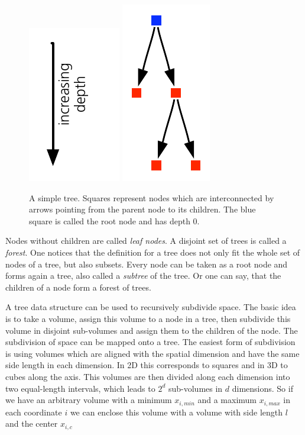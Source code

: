 \begin{figure}[htbp]
\begin{center}
\includegraphics[scale=1.0]{10tree_depth.pdf}
\includegraphics{08simpletree.pdf}
\caption{A simple tree. Squares represent nodes which are interconnected by arrows pointing from the parent node to its children. The blue square is called the root node and has depth $0$.}
\label{ch02_fig10}
\end{center}
\end{figure}

Nodes without children are called \emph{leaf nodes}. A disjoint set of trees is called a \emph{forest}. One notices that the definition for a tree does not only fit the whole set of nodes of a tree, but also subsets. Every node can be taken as a root node and forms again a tree, also called a \emph{subtree} of the tree. Or one can say, that the children of a node form a forest of trees.

A tree data structure can be used to recursively subdivide space. The basic idea is to take a volume, assign this volume to a node in a tree, then subdivide this volume in disjoint sub-volumes and assign them to the children of the node. The subdivision of space can be mapped onto a tree. The easiest form of subdivision is using volumes which are aligned with the spatial dimension and have the same side length in each dimension. In 2D this corresponds to squares and in 3D to cubes along the axis. This volumes are then divided along each dimension into two equal-length intervals, which leads to $2^d$ sub-volumes in $d$ dimensions. So if we have an arbitrary volume with a minimum $x_{i,min}$ and a maximum $x_{i,max}$ in each coordinate $i$ we can enclose this volume with a volume with side length $l$ and the center $x_{i,c}$

